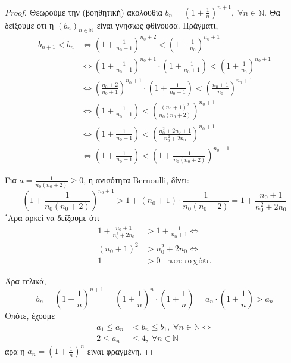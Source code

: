 \documentclass[main.tex]{subfiles}
\begin{document}
\begin{proof}
\item {}
    Θεωρούμε την (βοηθητική) ακολουθία $ b_{n} = \left(1+ \frac{1}{n} \right)^{n+1}, 
    \; \forall n \in \mathbb{N}$. Θα δείξουμε ότι η $ (b_{n})_{n \in \mathbb{N}} $ 
    είναι γνησίως φθίνουσα. Πράγματι, 
    \begin{align*}
        b_{n+1}< b_{n} 
        &\Leftrightarrow \left(1+ \frac{1}{n_{0}+1} \right)^{n_{0}+2} < \left(1 + 
        \frac{1}{n_{0}} \right)^{n_{0} +1} \\
        & \Leftrightarrow \left(1+ \frac{1}{n_{0}+1} \right)^{n_{0}+1} \cdot 
        \left(1 + \frac{1}{n_{0}+1}\right) < \left(1+ \frac{1}{n_{0}} \right)^{n_{0}+1}
        \\
        & \Leftrightarrow \left(\frac{n_{0}+2}{n_{0}+1} \right)^{n_{0}+1} 
        \cdot \left(1 + \frac{1}{n_{0}+1}\right) < \left(\frac{n_{0}+1}{n_{0}} 
            \right)^{n_{0}+1} \\
        & \Leftrightarrow \left(1 + \frac{1}{n_{0}+1} \right) < 
        \left(\frac{(n_{0}+1)^{2}}{n_{0}(n_{0} +2)} \right)^{n_{0}+1} \\
        & \Leftrightarrow \left(1 + \frac{1}{n_{0}+1} \right) < \left(\frac{n_{0}^{2}+
        2 n_{0}+1}{n_{0}^{2}+2 n_{0}} \right)^{n_{0}+1} \\
        & \Leftrightarrow \left(1 + \frac{1}{n_{0}+1} \right) < 
        \left(1+ \frac{1}{n_{0}(n_{0}+2)} \right)^{n_{0}+1}
     \end{align*} 

     Για $ a= \frac{1}{n_{0}(n_{0}+2)} \geq 0 $, η ανισότητα Bernoulli, δίνει:
     \[
         \left(1+ \frac{1}{n_{0}(n_{0}+2)} \right)^{n_{0}+1} > 1 + (n_{0}+1)\cdot 
         \frac{1}{n_{0}(n_{0}+2)} = 1 + \frac{n_{0}+1}{n_{0}^{2}+ 2 n_{0}} 
      \] 
      ΄Αρα αρκεί να δείξουμε ότι 
      \begin{align*}
          1 + \frac{n_{0}+1}{n_{0}^{2}+ 2 n_{0}} &> 1 + \frac{1}{n_{0}+1} 
          \Leftrightarrow  \\
          (n_{0}+1)^{2} &> n_{0}^{2} + 2 n_{0} \Leftrightarrow \\
          1 &> 0 \quad \text{που ισχύει.}
       \end{align*}

       Άρα τελικά,
   \[
       b_{n} = \left(1+ \frac{1}{n} \right)^{n+1} = \left(1+ \frac{1}{n} \right)^{n} 
       \cdot \left(1 + \frac{1}{n} \right) = a_{n}\cdot \left(1+ \frac{1}{n} \right) 
     > a_{n} 
    \]
    Οπότε, έχουμε
    \begin{align*}
        a_{1} \leq a_{n} &< b_{n} \leq b_{1}, \; \forall n \in \mathbb{N} 
        \Leftrightarrow \\
        2 \leq a_{n} &\leq 4, \; \forall n \in \mathbb{N}
     \end{align*}
     άρα η $ a_{n} = \left(1 + \frac{1}{n} \right)^{n} $ είναι φραγμένη.
\end{proof}
\end{document}
